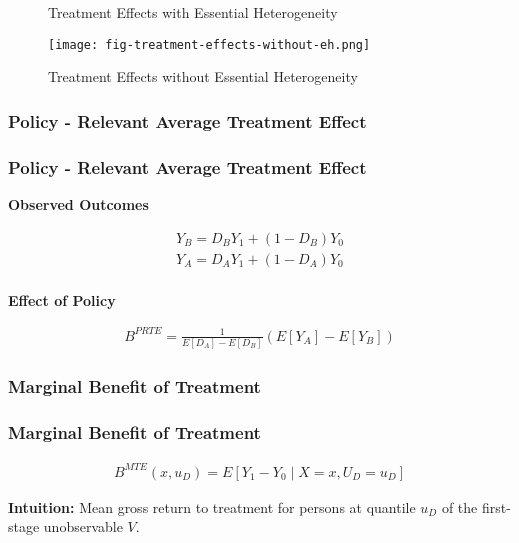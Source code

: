 \begin{frame}

\begin{figure}[htp]\centering
	\caption{Treatment Effects with Essential Heterogeneity}\label{Treatment Effects Conventional}
\end{figure}

\end{frame}


\begin{frame}

\begin{figure}[htp]\centering
	\caption{Treatment Effects without Essential Heterogeneity}\label{Treatment Effects Without Essential Heterogeneity}\scalebox{0.35}
	{\texttt{[image: fig-treatment-effects-without-eh.png]}}
\end{figure}

\end{frame}


\begin{frame}
    \subsubsection{Policy - Relevant Average Treatment Effect}\label{policy---relevant-average-treatment-effect}
\frametitle{Policy - Relevant Average Treatment Effect}

\textbf{Observed Outcomes}

\begin{align*}
Y_B = D_B Y_1 + (1 - D_B) Y_0 \\
Y_A = D_A Y_1 + (1 - D_A) Y_0 \\
\end{align*}

\textbf{Effect of Policy}

\begin{align*}
B^{PRTE} = \frac{1}{E[D_A] - E[D_B]} (E[Y_A] - E[Y_B])
\end{align*}

\end{frame}


\begin{frame}
    \subsubsection{Marginal Benefit of Treatment}\label{marginal-benefit-of-treatment}
\frametitle{Marginal Benefit of Treatment}

\begin{align*}
B^{MTE}(x, u_D) = E [Y_1 - Y_0 \mid X = x, U_D = u_D]
\end{align*}

\textbf{Intuition:} Mean gross return to treatment for persons at
quantile \(u_D\) of the first-stage unobservable \(V\).

\end{frame}


